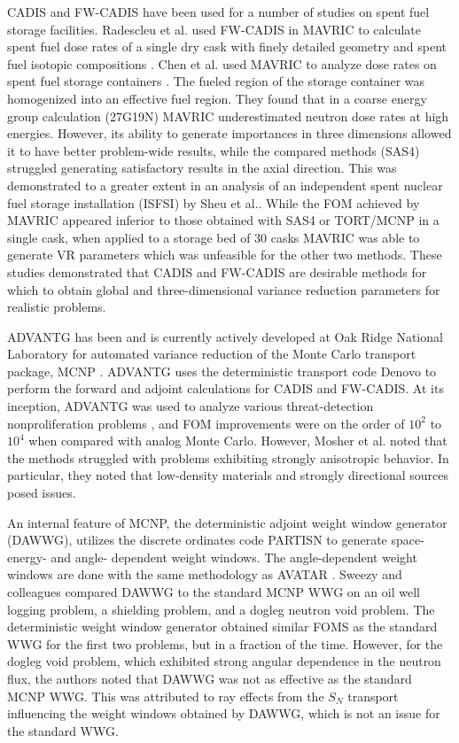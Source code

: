 CADIS and FW-CADIS have been used for a number of studies on spent fuel storage
facilities.
Radescleu et al. used FW-CADIS in MAVRIC to calculate spent fuel
dose rates of a single dry cask
with finely detailed geometry and spent fuel isotopic compositions
\cite{radulescu_dose_2013}.
Chen et al. used MAVRIC \cite{SCALE6_1} to analyze dose rates on spent fuel
storage containers \cite{chen_surface_2011}. The fueled region of the storage
container was homogenized into an effective fuel region.
They found that in a coarse energy
group calculation (27G19N) MAVRIC underestimated neutron dose rates at high
energies. However, its ability to generate importances in three dimensions
allowed it to have better problem-wide results, while the compared methods
(SAS4) struggled generating satisfactory results in the axial direction. This
was demonstrated to a greater extent in an analysis of an independent spent
nuclear fuel storage installation (ISFSI) \cite{sheu_dose_2011} by Sheu et al..
While the FOM
achieved by MAVRIC appeared inferior to those obtained with SAS4 or TORT/MCNP in
a single cask, when applied to a storage bed of 30 casks MAVRIC was able to
generate VR parameters which was unfeasible for the other two methods. These
studies demonstrated that CADIS and FW-CADIS are desirable methods for which to
obtain global and three-dimensional variance reduction parameters for realistic
problems.

ADVANTG \cite{mosher_automated_2009}
has been and is currently actively
developed at Oak Ridge National Laboratory \cite{mosher_new_2010,
wagner_review_2011, bevill_new_2012} for automated variance reduction of
the Monte Carlo transport package, MCNP \cite{mcnp_manual_v2}.
ADVANTG uses the deterministic
transport code Denovo \cite{evans_denovo:_2010} to perform the forward and
adjoint calculations for CADIS and FW-CADIS. At its inception, ADVANTG was used
to analyze various threat-detection nonproliferation problems
\cite{mosher_automated_2009}, and FOM improvements were on the order of $10^2$
to $10^4$ when compared with analog Monte Carlo. However, Mosher et al. noted
that the methods struggled with problems exhibiting strongly anisotropic
behavior. In particular, they noted that low-density materials and strongly
directional sources posed issues.

An internal feature of MCNP, the deterministic adjoint weight window generator
(DAWWG), utilizes the discrete ordinates code PARTISN
\cite{sweezy_automated_2005} to generate space- energy- and angle- dependent
weight windows. The angle-dependent weight windows are done with the same
methodology as AVATAR \cite{sweezy_automated_2005, van_riper_generation_1995}.
Sweezy and colleagues compared
DAWWG to the standard MCNP WWG on an oil well logging problem, a shielding
problem, and a dogleg neutron void problem. The deterministic weight window
generator obtained similar FOMS as the standard WWG for the first two problems,
but in a fraction of the time. However, for the dogleg void problem, which
exhibited strong angular dependence in the neutron flux,
the authors noted that DAWWG was not as effective as the
standard MCNP WWG. This was attributed to ray effects from the $S_N$ transport
influencing the weight windows obtained by DAWWG, which is not an issue for the
standard WWG.

